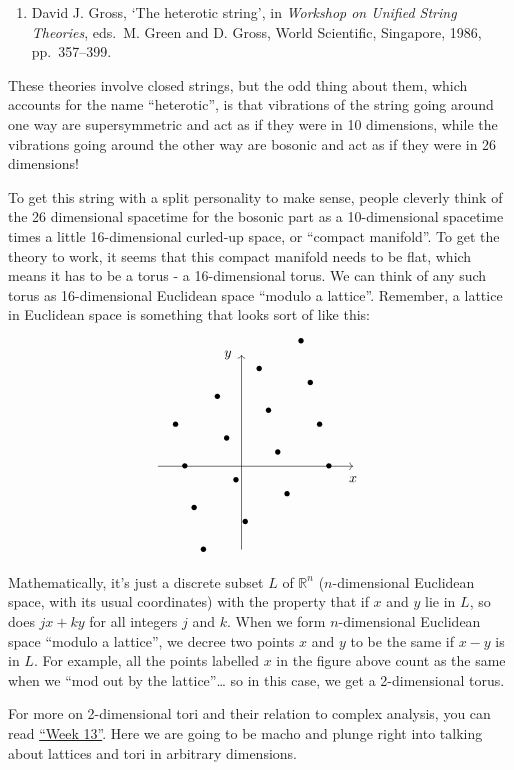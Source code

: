 \documentclass{article}
\def\tightlist{}
\begin{document}
\begin{enumerate}
\def\labelenumi{\arabic{enumi})}
\setcounter{enumi}{4}
\tightlist
\item
  David J. Gross, `The heterotic string', in \emph{Workshop on Unified
  String Theories}, eds.~M. Green and D. Gross, World Scientific,
  Singapore, 1986, pp.~357--399.
\end{enumerate}

These theories involve closed strings, but the odd thing about them,
which accounts for the name ``heterotic'', is that vibrations of the
string going around one way are supersymmetric and act as if they were
in 10 dimensions, while the vibrations going around the other way are
bosonic and act as if they were in 26 dimensions!

To get this string with a split personality to make sense, people
cleverly think of the 26 dimensional spacetime for the bosonic part as a
10-dimensional spacetime times a little 16-dimensional curled-up space,
or ``compact manifold''. To get the theory to work, it seems that this
compact manifold needs to be flat, which means it has to be a torus - a
16-dimensional torus. We can think of any such torus as 16-dimensional
Euclidean space ``modulo a lattice''. Remember, a lattice in Euclidean
space is something that looks sort of like this: \[
  \begin{tikzpicture}[scale=0.7]
    \draw[->] (-3,0) to (4,0) node[label=below:{$x$}]{};
    \draw[->] (0,-3) to (0,4) node[label=left:{$y$}]{};
    \foreach \m in {-1,0,1,2}
    {
      \foreach \n in {-1,0,1,2}
      {
        \node at ({\m*1.5-\n/3-0.2},{1.5*\n+\m-0.5}) {$\bullet$};
      }
    }
  \end{tikzpicture}
\] Mathematically, it's just a discrete subset \(L\) of \(\mathbb{R}^n\)
(\(n\)-dimensional Euclidean space, with its usual coordinates) with the
property that if \(x\) and \(y\) lie in \(L\), so does \(jx + ky\) for
all integers \(j\) and \(k\). When we form \(n\)-dimensional Euclidean
space ``modulo a lattice'', we decree two points \(x\) and \(y\) to be
the same if \(x-y\) is in \(L\). For example, all the points labelled
\(x\) in the figure above count as the same when we ``mod out by the
lattice''\ldots{} so in this case, we get a 2-dimensional torus.

For more on 2-dimensional tori and their relation to complex analysis,
you can read \protect\hyperlink{week13}{``Week 13''}. Here we are going
to be macho and plunge right into talking about lattices and tori in
arbitrary dimensions.
\end{document}
